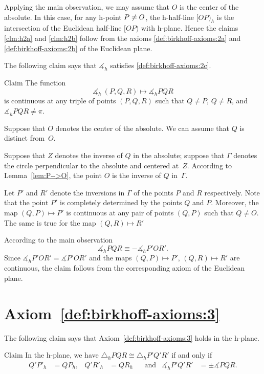 Applying the main observation, 
we may assume that $O$ is the center of the absolute.
In this case, for any h-point $P\z\ne O$, the h-half-line
$[OP)_h$ is the intersection of the Euclidean half-line $[OP)$ with h-plane.
Hence the claims \ref{clm:h2a} and \ref{clm:h2b} 
follow from the axioms \ref{def:birkhoff-axioms:2a} and \ref{def:birkhoff-axioms:2b} of the Euclidean plane.
\qeds

The following claim says that
$\measuredangle_h$ satisfies
 \ref{def:birkhoff-axioms:2c}.

\begin{thm}{Claim}\label{clm:h2c}
The function 
$$\measuredangle_h\:(P,Q,R)\mapsto\measuredangle_h P Q R$$
is continuous at any triple of points $(P,Q,R)$
such that $Q\ne P$, $Q\ne R$, and $\measuredangle_h P Q R\ne\pi$.
\end{thm}

Suppose that $O$ denotes the center of the absolute.
We can assume that $Q$ is distinct from~$O$.

Suppose that $Z$ denotes the inverse of $Q$ in the absolute;
suppose that $\Gamma$ denotes the circle perpendicular to the absolute and centered at~$Z$.
According to Lemma~\ref{lem:P-->O},
the point $O$ is the inverse of $Q$ in~$\Gamma$.

Let $P'$ and $R'$ denote the inversions in $\Gamma$ of the points $P$ and $R$ respectively.
Note that the point $P'$ is completely determined by the points $Q$ and $P$.
Moreover, the map $(Q,P)\mapsto P'$ is continuous at any pair of points $(Q,P)$ such that $Q\ne O$.
The same is true for the map $(Q,R)\mapsto R'$

According to the main observation 
$$\measuredangle_h P Q R\equiv -\measuredangle_h P' O R'.$$
Since $\measuredangle_h P' O R'=\measuredangle P' O R'$ and 
the maps $(Q,P)\mapsto P'$, $(Q,R)\mapsto R'$ are continuous,
the claim follows from the corresponding axiom of the Euclidean plane.
\qeds

\section*{Axiom~\ref{def:birkhoff-axioms:3}}

The following claim says that Axiom~\ref{def:birkhoff-axioms:3} holds in the h-plane.

\begin{thm}{Claim}
In the h-plane, we have
$\triangle_h P Q R 
\cong
\triangle_h P' Q' R'$
if and only if 
\begin{align*}
Q' P'_h&=Q P_h, & Q' R'_h&= Q R_h &&\text{and}
&\measuredangle_h P' Q' R'&=\pm\measuredangle P Q R.
\end{align*}
 
\end{thm}

